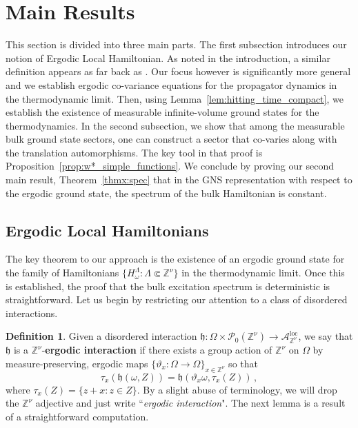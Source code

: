 \documentclass{article}
\newcommand{\Znu}{\mathbb{Z}^\nu}
\DeclareMathOperator{\loc}{loc}
\newcommand{\aloc}{\mathcal{A}_{\mathbb{Z}^\nu}^{\loc}}
\newcommand{\<}{\langle}
\renewcommand{\>}{\rangle}
\newcommand{\h}{\mathfrak{h}}
\theoremstyle{definition}
\newtheorem{define}[thm]{Definition}
\numberwithin{equation}{section}
\begin{document}
\section{Main Results}
This section is divided into three main parts. The first subsection introduces our notion of Ergodic Local Hamiltonian. As noted in the introduction, a similar definition appears as far back as \cite{PasturFigotin}. Our focus however is significantly more general and we establish ergodic co-variance equations for the propagator dynamics in the thermodynamic limit. Then, using Lemma~\ref{lem:hitting_time_compact}, we establish the existence of measurable infinite-volume ground states for the thermodynamics. In the second subsection, we show that among the measurable bulk ground state sectors, one can construct a sector that co-varies along with the translation automorphisms. The key tool in that proof is Proposition~\ref{prop:w*_simple_functions}. We conclude by proving our second main result, Theorem~\ref{thmx:spec} that in the GNS representation with respect to the ergodic ground state, the spectrum of the bulk Hamiltonian is constant. 

\subsection{Ergodic Local Hamiltonians}
The key theorem to our approach is the existence of an ergodic ground state for the family of Hamiltonians $\{H^{\Lambda}_{\omega}: \Lambda \Subset \Znu\}$ in the thermodynamic limit. Once this is established, the proof that the bulk excitation spectrum is deterministic is straightforward. Let us begin by restricting our attention to a class of disordered interactions. 


\begin{define}
    Given a disordered interaction $\h:\Omega \times \mathscr{P}_0(\Znu) \to \aloc$, we say that $\h$ is a $\Znu$-\textbf{ergodic interaction} if there exists a group action of $\Znu$ on $\Omega$ by measure-preserving, ergodic maps $\{\vartheta_x\colon\Omega \to \Omega\}_{ x\in \Znu}$  so that
\begin{equation}\label{eqn:ergodic_interaction}
    \tau_x(\h(\omega, Z)) = \h(\vartheta_x \omega, \tau_x(Z))\,,
\end{equation} where $\tau_x(Z) = \{z+x\colon z\in Z\}$. By a slight abuse of terminology, we will drop the $\Znu$ adjective and just write ``\emph{ergodic interaction}". The next lemma is a result of a straightforward computation.
\end{define} 
\end{document}

